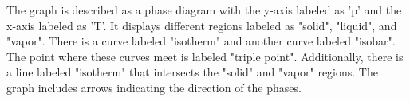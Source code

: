 The graph is described as a phase diagram with the y-axis labeled as 'p' and the x-axis labeled as 'T'. It displays different regions labeled as "solid", "liquid", and "vapor". There is a curve labeled "isotherm" and another curve labeled "isobar". The point where these curves meet is labeled "triple point". Additionally, there is a line labeled "isotherm" that intersects the "solid" and "vapor" regions. The graph includes arrows indicating the direction of the phases.